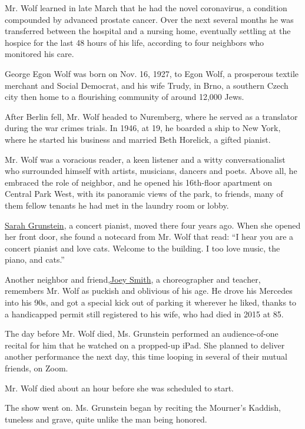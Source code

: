 Mr. Wolf learned in late March that he had the novel coronavirus, a
condition compounded by advanced prostate cancer. Over the next several
months he was transferred between the hospital and a nursing home,
eventually settling at the hospice for the last 48 hours of his life,
according to four neighbors who monitored his care.

George Egon Wolf was born on Nov. 16, 1927, to Egon Wolf, a prosperous
textile merchant and Social Democrat, and his wife Trudy, in Brno, a
southern Czech city then home to a flourishing community of around
12,000 Jews.

After Berlin fell, Mr. Wolf headed to Nuremberg, where he served as a
translator during the war crimes trials. In 1946, at 19, he boarded a
ship to New York, where he started his business and married Beth
Horelick, a gifted pianist.

Mr. Wolf was a voracious reader, a keen listener and a witty
conversationalist who surrounded himself with artists, musicians,
dancers and poets. Above all, he embraced the role of neighbor, and he
opened his 16th-floor apartment on Central Park West, with its panoramic
views of the park, to friends, many of them fellow tenants he had met in
the laundry room or lobby.

\href{https://www.sarahgrunstein.com/bio.html}{Sarah Grunstein}, a
concert pianist, moved there four years ago. When she opened her front
door, she found a notecard from Mr. Wolf that read: ``I hear you are a
concert pianist and love cats. Welcome to the building. I too love
music, the piano, and cats.''

Another neighbor and
friend,\href{http://www.danceatlaguardiahs.org/html/joey_r__smith.html}{Joey
Smith}, a choreographer and teacher, remembers Mr. Wolf as puckish and
oblivious of his age. He drove his Mercedes into his 90s, and got a
special kick out of parking it wherever he liked, thanks to a
handicapped permit still registered to his wife, who had died in 2015 at
85.

The day before Mr. Wolf died, Ms. Grunstein performed an audience-of-one
recital for him that he watched on a propped-up iPad. She planned to
deliver another performance the next day, this time looping in several
of their mutual friends, on Zoom.

Mr. Wolf died about an hour before she was scheduled to start.

The show went on. Ms. Grunstein began by reciting the Mourner's Kaddish,
tuneless and grave, quite unlike the man being honored.

